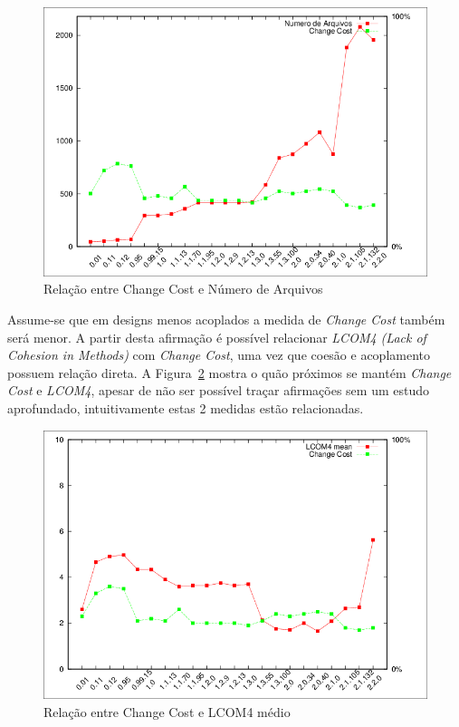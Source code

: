 \begin{figure}[h]
\center
\includegraphics[scale=0.3]{imagens/plot-files.png}
\caption{Relação entre Change Cost e Número de Arquivos}
\label{fig:files}
\end{figure}

Assume-se que em designs menos acoplados a medida de {\it Change Cost} também
será menor. A partir desta afirmação é possível relacionar {\it LCOM4 (Lack of
Cohesion in Methods)} com {\it Change Cost}, uma vez que coesão e acoplamento
possuem relação direta. A Figura~\ref{fig:lcom4} mostra o quão próximos se
mantém {\it Change Cost} e {\it LCOM4}, apesar de não ser possível traçar
afirmações sem um estudo aprofundado, intuitivamente estas 2 medidas estão
relacionadas.

\begin{figure}[h]
\center
\includegraphics[scale=0.3]{imagens/plot-lcom4.png}
\caption{Relação entre Change Cost e LCOM4 médio}
\label{fig:lcom4}
\end{figure}

